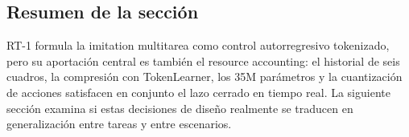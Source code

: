 \subsection{Resumen de la sección}

RT-1 formula la imitation multitarea como control autorregresivo tokenizado, pero su aportación central es también el resource accounting: el historial de seis cuadros, la compresión con TokenLearner, los 35M parámetros y la cuantización de acciones satisfacen en conjunto el lazo cerrado en tiempo real. La siguiente sección examina si estas decisiones de diseño realmente se traducen en generalización entre tareas y entre escenarios.
